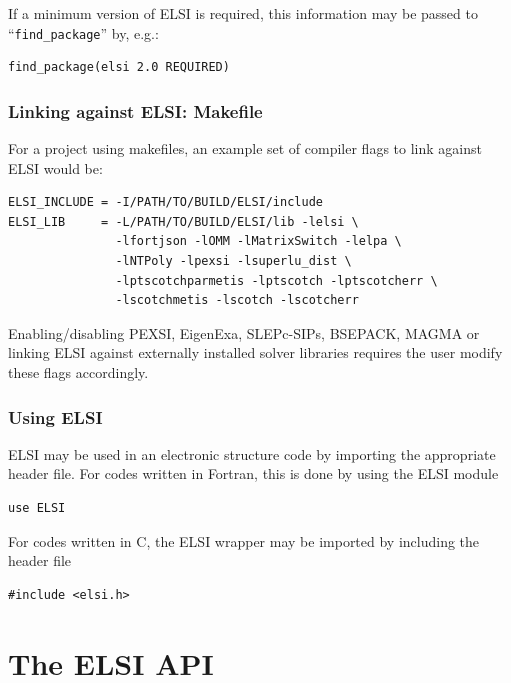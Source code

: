 \documentclass{report}
\begin{document}
If a minimum version of ELSI is required, this information may be passed to ``\texttt{find\_package}'' by, e.g.:
\begin{tcolorbox}
\begin{verbatim}
find_package(elsi 2.0 REQUIRED)
\end{verbatim}
\end{tcolorbox}

\subsection{Linking against ELSI: Makefile}
\label{subsec:import_makefile}
For a project using makefiles, an example set of compiler flags to link against ELSI would be:
\begin{tcolorbox}
\begin{verbatim}
ELSI_INCLUDE = -I/PATH/TO/BUILD/ELSI/include
ELSI_LIB     = -L/PATH/TO/BUILD/ELSI/lib -lelsi \
               -lfortjson -lOMM -lMatrixSwitch -lelpa \
               -lNTPoly -lpexsi -lsuperlu_dist \
               -lptscotchparmetis -lptscotch -lptscotcherr \
               -lscotchmetis -lscotch -lscotcherr
\end{verbatim}
\end{tcolorbox}

Enabling/disabling PEXSI, EigenExa, SLEPc-SIPs, BSEPACK, MAGMA or linking ELSI against externally installed solver libraries requires the user modify these flags accordingly.

\subsection{Using ELSI}
\label{subsec:import_use}
ELSI may be used in an electronic structure code by importing the appropriate header file. For codes written in Fortran, this is done by using the ELSI module
\begin{tcolorbox}
\begin{verbatim}
use ELSI
\end{verbatim}
\end{tcolorbox}

For codes written in C, the ELSI wrapper may be imported by including the header file
\begin{tcolorbox}
\begin{verbatim}
#include <elsi.h>
\end{verbatim}
\end{tcolorbox}

\chapter{The ELSI API}
\end{document}
